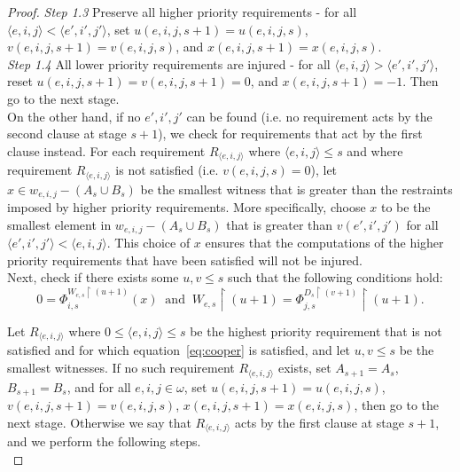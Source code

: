\documentclass{article}
\begin{document}
\begin{proof}
    \textit{Step 1.3} Preserve all higher priority requirements - for all
    $\langle e,i,j\rangle <\langle e',i',j'\rangle$, set
    $u(e,i,j,s+1)=u(e,i,j,s)$, $v(e,i,j,s+1)=v(e,i,j,s)$, and
    $x(e,i,j,s+1)=x(e,i,j,s)$. \\

    \textit{Step 1.4} All lower priority requirements are injured - for all
    $\langle e,i,j\rangle >\langle e',i',j'\rangle$, reset
    $u(e,i,j,s+1)=v(e,i,j,s+1)=0$, and $x(e,i,j,s+1)=-1$. Then go to
    the next stage. \\

    On the other hand, if no $e',i',j'$ can be found (i.e. no requirement
    acts by the second clause at stage $s+1$), we check for requirements
    that act by the first clause instead. For each requirement $R_{\langle
    e,i,j\rangle}$ where $\langle e,i,j\rangle \leq s$ and where
    requirement $R_{\langle e,i,j\rangle}$ is not satisfied (i.e.
    $v(e,i,j,s)=0$), let $x\in w_{e,i,j}-(A_s\cup B_s)$ be
    the smallest witness that is greater than the restraints imposed by
    higher priority requirements. More specifically,
    choose $x$ to be the smallest element in $w_{e,i,j}-(A_s\cup B_s)$ that
    is greater than $v(e',i',j')$ for all $\langle e',i',j'\rangle <\langle
    e,i,j\rangle$. This choice of $x$ ensures that the computations of the
    higher priority requirements that have been satisfied will not be
    injured. \\

    Next, check if there exists some $u,v\leq s$ such that the following
    conditions hold:
    \begin{equation}
      0 =\Phi_{i,s}^{W_{e,s}\restriction (u+1)} (x)\;\; \text{and}\;\;
      W_{e,s}\restriction (u+1) =\Phi_{j,s}^{D_s\restriction (v+1)}
      \restriction (u+1).
      \label{eq:cooper}
    \end{equation}

    Let $R_{\langle e,i,j\rangle}$ where $0\leq \langle e,i,j\rangle \leq
    s$ be the highest priority requirement that is not satisfied and for
    which equation~\eqref{eq:cooper} is satisfied, and let $u,v\leq s$ be
    the smallest witnesses. If no such requirement
    $R_{\langle e,i,j\rangle}$ exists, set $A_{s+1}=A_s$, $B_{s+1}=B_s$,
    and for all $e,i,j\in\omega$, set $u(e,i,j,s+1)=u(e,i,j,s)$,
    $v(e,i,j,s+1)=v(e,i,j,s)$, $x(e,i,j,s+1)=x(e,i,j,s)$,
    then go to the next stage. Otherwise we say that $R_{\langle
    e,i,j\rangle}$ acts by the first clause at stage $s+1$, and we perform
    the following steps. \\


\end{proof}
\end{document}
